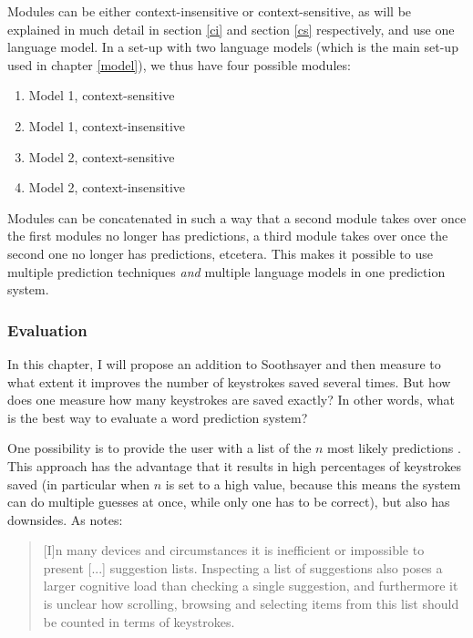 \documentclass[12pt]{article}
\begin{document}
Modules can be either context-insensitive or context-sensitive, as will be explained in much detail in section \ref{ci} and section \ref{cs} respectively, and use one language model. In a set-up with two language models (which is the main set-up used in chapter \ref{model}), we thus have four possible modules:

\begin{enumerate}
\item Model 1, context-sensitive
\item Model 1, context-insensitive
\item Model 2, context-sensitive
\item Model 2, context-insensitive
\end{enumerate}

Modules can be concatenated in such a way that a second module takes over once the first modules no longer has predictions, a third module takes over once the second one no longer has predictions, etcetera. This makes it possible to use multiple prediction techniques \emph{and} multiple language models in one prediction system.

\subsubsection{Evaluation}
In this chapter, I will propose an addition to Soothsayer and then measure to what extent it improves the number of keystrokes saved several times. But how does one measure how many keystrokes are saved exactly? In other words, what is the best way to evaluate a word prediction system?

One possibility is to provide the user with a list of the $n$ most likely predictions \cite{Lesher+99,Fazly+03}. This approach has the advantage that it results in high percentages of keystrokes saved (in particular when $n$ is set to a high value, because this means the system can do multiple guesses at once, while only one has to be correct), but also has downsides. As  notes: 

\begin{quotation}
[I]n many devices and circumstances it is inefficient or impossible to present [...] suggestion lists. Inspecting a list of suggestions also poses a larger cognitive load than checking a single suggestion, and furthermore it is unclear how scrolling, browsing and selecting items from this list should be counted in terms of keystrokes.
\end{quotation}
\end{document}

